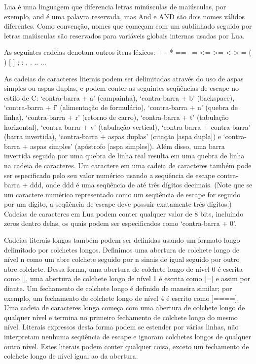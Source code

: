 \documentclass[
	12pt,				%
	openright,			%
	twoside,			%
	a4paper,			%
	english,			%
	brazil,				%
	]{abntex2}
\begin{document}
Lua é uma linguagem que diferencia letras minúsculas de maiúsculas, por exemplo, and é uma palavra reservada, mas And e AND são dois nomes válidos diferentes. Como convenção, nomes que começam com um sublinhado seguido por letras maiúsculas são reservados para variáveis globais internas usadas por Lua.

As seguintes cadeias denotam outros itens léxicos:
+ - * == ~= <= >= < > = ( ) { } [ ] ; : , . .. ...

As cadeias de caracteres literais podem ser delimitadas através do uso de aspas simples ou aspas duplas, e podem conter as seguintes seqüências de escape no estilo de C:  `contra-barra + a' (campainha), `contra-barra + b' (backspace), `contra-barra + f' (alimentação de formulário), `contra-barra + n' (quebra de linha), `contra-barra + r' (retorno de carro), `contra-barra + t' (tabulação horizontal), `contra-barra + v' (tabulação vertical), `contra-barra + contra-barra' (barra invertida), `contra-barra + aspas duplas' (citação [aspa dupla]) e `contra-barra + aspas simples' (apóstrofo [aspa simples]). Além disso, uma barra invertida seguida por uma quebra de linha real resulta em uma quebra de linha na cadeia de caracteres. Um caractere em uma cadeia de caracteres também pode ser especificado pelo seu valor numérico usando a seqüência de escape contra-barra + ddd, onde ddd é uma seqüência de até três dígitos decimais. (Note que se um caractere numérico representado como um seqüência de escape for seguido por um dígito, a seqüência de escape deve possuir exatamente três dígitos.) Cadeias de caracteres em Lua podem conter qualquer valor de 8 bits, incluindo zeros dentro delas, os quais podem ser especificados como `contra-barra + 0'.

Cadeias literais longas também podem ser definidas usando um formato longo delimitado por colchetes longos. Definimos uma abertura de colchete longo de nível n como um abre colchete seguido por n sinais de igual seguido por outro abre colchete. Dessa forma, uma abertura de colchete longo de nível 0 é escrita como [[, uma abertura de colchete longo de nível 1 é escrita como [=[ e assim por diante.	 Um fechamento de colchete longo é definido de maneira similar; por exemplo, um fechamento de colchete longo de nível 4 é escrito como ]====]. Uma cadeia de caracteres longa começa com uma abertura de colchete longo de qualquer nível e termina no primeiro fechamento de colchete longo do mesmo nível. Literais expressos desta forma podem se estender por várias linhas, não interpretam nenhuma seqüência de escape e ignoram colchetes longos de qualquer outro nível. Estes literais podem conter qualquer coisa, exceto um fechamento de colchete longo de nível igual ao da abertura.
\end{document}
